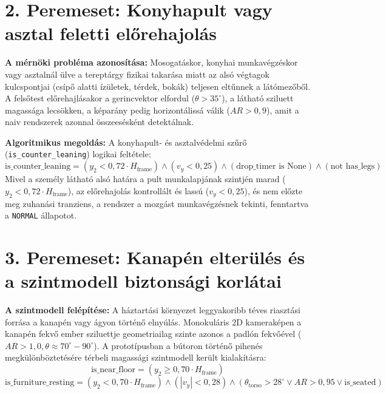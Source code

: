 \documentclass[12pt,a4paper,oneside]{report}
\begin{document}
\section{2. Peremeset: Konyhapult vagy asztal feletti előrehajolás}
\textbf{A mérnöki probléma azonosítása:} Mosogatáskor, konyhai munkavégzéskor vagy asztalnál ülve a tereptárgy fizikai takarása miatt az alsó végtagok kulcspontjai (csípő alatti ízületek, térdek, bokák) teljesen eltűnnek a látómezőből. A felsőtest előrehajlásakor a gerincvektor elfordul ($\theta > 35^\circ$), a látható sziluett magassága lecsökken, a képarány pedig horizontálissá válik ($AR > 0{,}9$), amit a naiv rendszerek azonnal összeesésként detektálnak.

\textbf{Algoritmikus megoldás:} A konyhapult- és asztalvédelmi szűrő (\texttt{is\_counter\_leaning}) logikai feltétele:
\begin{equation}
    \text{is\_counter\_leaning} = (y_2 < 0{,}72 \cdot H_{\text{frame}}) \land (v_y < 0{,}25) \land (\text{drop\_timer is None}) \land (\text{not has\_legs})
\end{equation}
Mivel a személy látható alsó határa a pult munkalapjának szintjén marad ($y_2 < 0{,}72 \cdot H_{\text{frame}}$), az előrehajolás kontrollált és lassú ($v_y < 0{,}25$), és nem előzte meg zuhanási tranziens, a rendszer a mozgást munkavégzésnek tekinti, fenntartva a \texttt{NORMAL} állapotot.

\section{3. Peremeset: Kanapén elterülés és a szintmodell biztonsági korlátai}
\textbf{A szintmodell felépítése:} A háztartási környezet leggyakoribb téves riasztási forrása a kanapén vagy ágyon történő elnyúlás. Monokuláris 2D kameraképen a kanapén fekvő ember sziluettje geometriailag szinte azonos a padlón fekvőével ($AR > 1{,}0, \theta \approx 70^\circ - 90^\circ$). A prototípusban a bútoron történő pihenés megkülönböztetésére térbeli magassági szintmodell került kialakításra:
\begin{equation}
    \text{is\_near\_floor} = (y_2 \ge 0{,}70 \cdot H_{\text{frame}})
\end{equation}
\begin{equation}
    \text{is\_furniture\_resting} = (y_2 < 0{,}70 \cdot H_{\text{frame}}) \land (|v_y| < 0{,}28) \land (\theta_{\text{torso}} > 28^\circ \lor AR > 0{,}95 \lor \text{is\_seated})
\end{equation}
\end{document}
